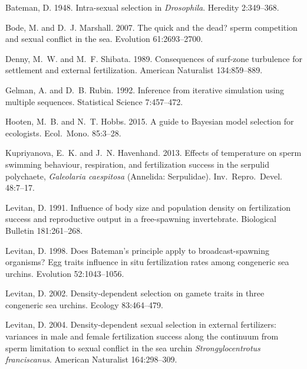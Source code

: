 \documentclass{article}
\begin{document}
\begin{thebibliography}{}

Bateman, D. 1948.
\newblock Intra-sexual selection in \textit{Drosophila}.
\newblock Heredity 2:349--368.

Bode, M. and D.~J. Marshall. 2007.
\newblock The quick and the dead? sperm competition and sexual conflict in the sea.
\newblock Evolution 61:2693--2700.

Denny, M.~W. and M.~F. Shibata. 1989.
\newblock Consequences of surf-zone turbulence for settlement and external fertilization.
\newblock American Naturalist 134:859--889.

Gelman, A. and D.~B. Rubin. 1992.
\newblock Inference from iterative simulation using multiple sequences.
\newblock Statistical Science 7:457--472.

Hooten, M.~B. and N.~T. Hobbs. 2015.
\newblock A guide to Bayesian model selection for ecologists.
\newblock Ecol.~Mono. 85:3--28.

Kupriyanova, E.~K. and J.~N. Havenhand. 2013.
\newblock Effects of temperature on sperm swimming behaviour, respiration, and fertilization success in the serpulid polychaete, \textit{Galeolaria caespitosa} (Annelida: Serpulidae).
\newblock Inv.~Repro.~Devel. 48:7--17.

Levitan, D. 1991.
\newblock Influence of body size and population density on fertilization success and reproductive output in a free-spawning invertebrate.
\newblock Biological Bulletin 181:261--268.

Levitan, D. 1998.
\newblock Does Bateman's principle apply to broadcast-spawning organisms? Egg traits influence in situ fertilization rates among congeneric sea urchins.
\newblock Evolution 52:1043--1056.

Levitan, D. 2002.
\newblock Density-dependent selection on gamete traits in three congeneric sea urchins.
\newblock Ecology 83:464--479.

Levitan, D. 2004.
\newblock Density-dependent sexual selection in external fertilizers: variances in male and female fertilization success along the continuum from sperm limitation to sexual conflict in the sea urchin \textit{Strongylocentrotus franciscanus}.
\newblock American Naturalist 164:298--309.


\end{thebibliography}
\end{document}
